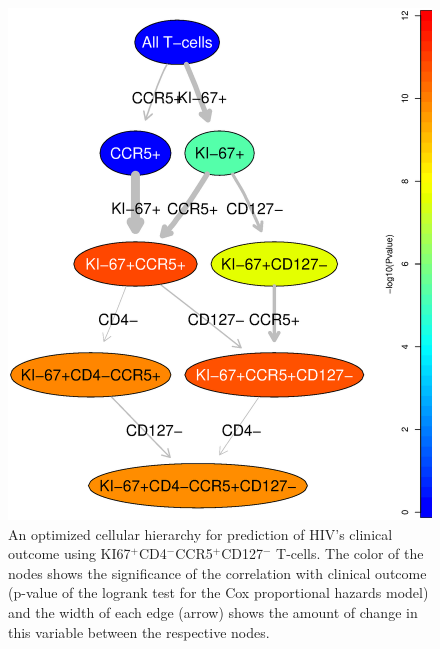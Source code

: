   \begin{figure}[ht]
    \begin{center}
      \includegraphics[width=13cm]{figs/rchy/figs/HIVClinicalOutcome}
    \end{center}
    \caption{An optimized cellular hierarchy for prediction of HIV's clinical outcome using KI67$^+$CD4$^-$CCR5$^+$CD127$^-$ T-cells. 
The color of the nodes shows the significance of the correlation with clinical outcome (p-value of the logrank test for the Cox proportional hazards model) and the width of each edge (arrow) shows the amount of change in this variable between the respective nodes. 
}
    \label{r1:HIVClinicalOutcome}
  \end{figure}

